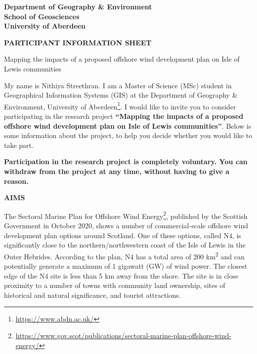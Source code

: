 {
\renewcommand\familydefault{\sfdefault}
\normalfont
\setlength{\parindent}{0pt}
\singlespacing

\begin{flushright}
\footnotesize
\bfseries
Department of Geography \& Environment \\
School of Geosciences \\
University of Aberdeen
\end{flushright}

\vspace{30pt}
\begin{center}
  \textbf{\MakeUppercase{Participant information sheet}}

  Mapping the impacts of a proposed offshore wind development plan on Isle of Lewis communities
\end{center}

\vspace{30pt}
My name is Nithiya Streethran. I am a Master of Science (MSc) student in Geographical Information Systems (GIS) at the Department of Geography \& Environment, University of Aberdeen\footnote{\url{https://www.abdn.ac.uk/}}. I would like to invite you to consider participating in the research project \textbf{``Mapping the impacts of a proposed offshore wind development plan on Isle of Lewis communities''}. Below is some information about the project, to help you decide whether you would like to take part.

\textbf{Participation in the research project is completely voluntary. You can withdraw from the project at any time, without having to give a reason.}

\vspace{30pt}
\textbf{\MakeUppercase{Aims}}

The Sectoral Marine Plan for Offshore Wind Energy\footnote{\url{https://www.gov.scot/publications/sectoral-marine-plan-offshore-wind-energy/}}, published by the Scottish Government in October 2020, shows a number of commercial-scale offshore wind development plan options around Scotland. One of these options, called N4, is significantly close to the northern/northwestern coast of the Isle of Lewis in the Outer Hebrides. According to the plan, N4 has a total area of 200 km\textsuperscript{2} and can potentially generate a maximum of 1 gigawatt (GW) of wind power. The closest edge of the N4 site is less than 5 km away from the shore. The site is in close proximity to a number of towns with community land ownership, sites of historical and natural significance, and tourist attractions.

}
